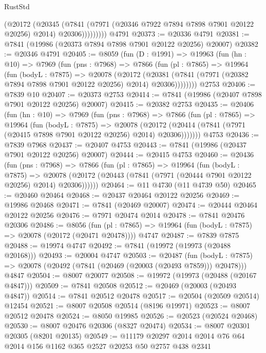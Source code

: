 \begin{lexlean}{RustStd}
\begin{coremodule}
{\begin{coremodule}
{{{{{{{{{{{{{{{{{{{{{{{{{{{{{{{{{{{{{{{{{{{{{{{{{{{{{{                (@20172
                  (@20345
                    (@7841
                      (@7971 (@20346 @7922 @7894 @7898 @7901 @20122 @20256) @2014)
                      @20306)))))))))
    @4791
@20373 := @20336 @4791
@20381 := @7841 (@19986 (@20373 @7894 @7898 @7901 @20122 @20256) @20007)
@20382 := @20346 @4791
@20405 := @8059
    (fun (D : @1991) =>
    @19963
      (fun (hn : @10) =>
      @7969
        (fun (pns : @7968) =>
        @7866
          (fun (pl : @7865) =>
          @19964
            (fun (bodyL : @7875) =>
            @20078
              (@20172
                (@20381 (@7841 (@7971 (@20382 @7894 @7898 @7901 @20122 @20256) @2014) @20306))))))))
    @2753
@20406 := @7839 @10
@20407 := @20373 @2753
@20414 := @7841 (@19986 (@20407 @7898 @7901 @20122 @20256) @20007)
@20415 := @20382 @2753
@20435 := @20406
    (fun (hn : @10) =>
    @7969
      (fun (pns : @7968) =>
      @7866
        (fun (pl : @7865) =>
        @19964
          (fun (bodyL : @7875) =>
          @20078
            (@20172 (@20414 (@7841 (@7971 (@20415 @7898 @7901 @20122 @20256) @2014) @20306)))))))
    @4753
@20436 := @7839 @7968
@20437 := @20407 @4753
@20443 := @7841 (@19986 (@20437 @7901 @20122 @20256) @20007)
@20444 := @20415 @4753
@20460 := @20436
    (fun (pns : @7968) =>
    @7866
      (fun (pl : @7865) =>
      @19964
        (fun (bodyL : @7875) =>
        @20078 (@20172 (@20443 (@7841 (@7971 (@20444 @7901 @20122 @20256) @2014) @20306))))))
@20464 := @11 @4730 (@11 @4739 @50)
@20465 := @20460 @20464
@20468 := @20437 @20464 @20122 @20256
@20469 := @19986 @20468
@20471 := @7841 (@20469 @20007)
@20474 := @20444 @20464 @20122 @20256
@20476 := @7971 @20474 @2014
@20478 := @7841 @20476 @20306
@20486 := @8056
    (fun (pl : @7865) => @19964 (fun (bodyL : @7875) => @20078 (@20172 (@20471 @20478))))
    @4747
@20487 := @7839 @7875
@20488 := @19974 @4747
@20492 := @7841 (@19972 (@19973 (@20488 @20168)))
@20493 := @20004 @4747
@20503 := @20487
    (fun (bodyL : @7875) => @20078 (@20492 (@7841 (@20469 (@20003 (@20493 @7859))) @20478)))
    @4847
@20504 := @8007 @20077
@20508 := @19972 (@19973 (@20488 (@20167 @4847)))
@20509 := @7841 @20508
@20512 := @20469 (@20003 (@20493 @4847))
@20514 := @7841 @20512 @20478
@20517 := @20504 (@20509 @20514) @12454
@20521 := @8007 @20508 @20514 (@8196 @19971)
@20523 := @8007 @20512 @20478
@20524 := @8050 @19985
@20526 := @20523 (@20524 @20468)
@20530 := @8007 @20476 @20306 (@8327 @20474)
@20534 := @8007 @20301 @20305 (@8201 @20135)
@20549 := @11179 @20297 @2014 @2014 @76 @64 @2014 @156 @1162 @365 @2527 @20253 @50 @2757 @438 @2341
}}}}}}}}}}}}}}}}}}}}}}}}}}}}}}}}}}}}}}}}}}}}}}}}}}}}}}
\end{coremodule}}
\end{coremodule}
\end{lexlean}
